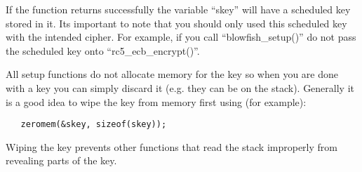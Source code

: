 \documentclass{book}
\begin{document}
If the function returns successfully the variable ``skey'' will have a scheduled key stored in it.  Its important to note
that you should only used this scheduled key with the intended cipher.  For example, if you call ``blowfish\_setup()'' do not
pass the scheduled key onto ``rc5\_ecb\_encrypt()''.

All setup functions do not allocate memory for the key so when you are done with a key you can simply discard it (e.g. they
can be on the stack).  Generally it is a good idea to wipe the key from memory first using (for example):
\begin{verbatim}
   zeromem(&skey, sizeof(skey));
\end{verbatim}

Wiping the key prevents other functions that read the stack improperly from revealing parts of the key.
\end{document}
